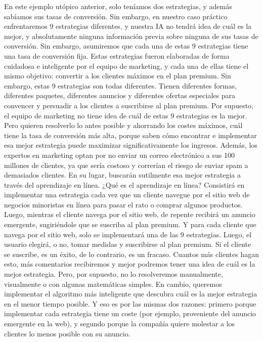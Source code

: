 \documentclass[
]{book}
\begin{document}
En este ejemplo utópico anterior, solo teníamos dos estrategias, y además sabíamos sus tasas de conversión. Sin embargo, en nuestro caso práctico enfrentaremos 9 estrategias diferentes, y nuestra IA no tendrá idea de cuál es la mejor, y absolutamente ninguna información previa sobre ninguna de sus tasas de conversión. Sin embargo, asumiremos que cada una de estas 9 estrategias tiene una tasa de conversión fija. Estas estrategias fueron elaboradas de forma cuidadosa e inteligente por el equipo de marketing, y cada una de ellas tiene el mismo objetivo: convertir a los clientes máximos en el plan premium. Sin embargo, estas 9 estrategias son todas diferentes. Tienen diferentes formas, diferentes paquetes, diferentes anuncios y diferentes ofertas especiales para convencer y persuadir a los clientes a suscribirse al plan premium. Por supuesto, el equipo de marketing no tiene idea de cuál de estas 9 estrategias es la mejor. Pero quieren resolverlo lo antes posible y ahorrando los costes máximos, cuál tiene la tasa de conversión más alta, porque saben cómo encontrar e implementar esa mejor estrategia puede maximizar significativamente los ingresos. Además, los expertos en marketing optan por no enviar un correo electrónico a sus 100 millones de clientes, ya que sería costoso y correrían el riesgo de enviar spam a demasiados clientes. En su lugar, buscarán sutilmente esa mejor estrategia a través del aprendizaje en línea. ¿Qué es el aprendizaje en línea? Consistirá en implementar una estrategia cada vez que un cliente navegue por el sitio web de negocios minoristas en línea para pasar el rato o comprar algunos productos. Luego, mientras el cliente navega por el sitio web, de repente recibirá un anuncio emergente, sugiriéndole que se suscriba al plan premium. Y para cada cliente que navega por el sitio web, solo se implementará una de las 9 estrategias. Luego, el usuario elegirá, o no, tomar medidas y suscribirse al plan premium. Si el cliente se suscribe, es un éxito, de lo contrario, es un fracaso. Cuantos más clientes hagan esto, más comentarios recibiremos y mejor podremos tener una idea de cuál es la mejor estrategia. Pero, por supuesto, no lo resolveremos manualmente, visualmente o con algunas matemáticas simples. En cambio, queremos implementar el algoritmo más inteligente que descubra cuál es la mejor estrategia en el menor tiempo posible. Y eso es por las mismas dos razones: primero porque implementar cada estrategia tiene un coste (por ejemplo, proveniente del anuncio emergente en la web), y segundo porque la compañía quiere molestar a los clientes lo menos posible con su anuncio.
\end{document}
